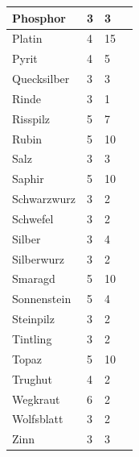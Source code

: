 \documentclass{article}
\begin{document}
\begin{small}
\begin{tabular}{|m{3cm}|m{3cm}|m{4cm}|m{6cm}|}
\hline
Phosphor&3&3& \\
\hline
Platin&4&15& \\
\hline
Pyrit&4&5& \\
\hline
Quecksilber&3&3& \\
\hline
Rinde&3&1& \\
\hline
Risspilz&5&7& \\
\hline
Rubin&5&10& \\
\hline
Salz&3&3& \\
\hline
Saphir&5&10& \\
\hline
Schwarzwurz&3&2& \\
\hline
Schwefel&3&2& \\
\hline
Silber&3&4& \\
\hline
Silberwurz&3&2& \\
\hline
Smaragd&5&10& \\
\hline
Sonnenstein&5&4& \\
\hline
Steinpilz&3&2& \\
\hline
Tintling&3&2& \\
\hline
Topaz&5&10& \\
\hline
Trughut&4&2& \\
\hline
Wegkraut&6&2& \\
\hline
Wolfsblatt&3&2& \\
\hline
Zinn&3&3& \\
\hline
\end{tabular}
\end{small}

\newpage
\end{document}
